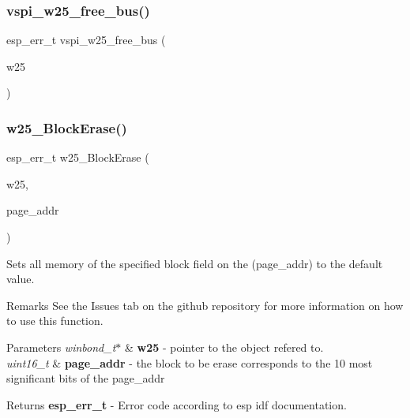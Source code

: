 \mbox{\label{_w25_n01_g_v_8h_ad6fb3cbe30326d7cc60cf88f444c931f}} 
\subsubsection{vspi\+\_\+w25\+\_\+free\+\_\+bus()}
{\footnotesize\ttfamily esp\+\_\+err\+\_\+t vspi\+\_\+w25\+\_\+free\+\_\+bus (\begin{DoxyParamCaption}\item[{\textbf{ winbond\+\_\+t} $\ast$}]{w25 }\end{DoxyParamCaption})}

\mbox{\label{_w25_n01_g_v_8h_aa081e561616cad89a37215626e830fa9}} 
\subsubsection{w25\+\_\+\+Block\+Erase()}
{\footnotesize\ttfamily esp\+\_\+err\+\_\+t w25\+\_\+\+Block\+Erase (\begin{DoxyParamCaption}\item[{const \textbf{ winbond\+\_\+t} $\ast$}]{w25,  }\item[{uint16\+\_\+t}]{page\+\_\+addr }\end{DoxyParamCaption})}

Sets all memory of the specified block field on the (page\+\_\+addr) to the default value. \begin{DoxyRemark}{Remarks}
See the Issues tab on the github repository for more information on how to use this function. 
\end{DoxyRemark}

\begin{DoxyParams}{Parameters}
{\em winbond\+\_\+t$\ast$} & {\bfseries w25} -\/ pointer to the object refered to. \\
\hline
{\em uint16\+\_\+t} & {\bfseries page\+\_\+addr} -\/ the block to be erase corresponds to the 10 most significant bits of the page\+\_\+addr \\
\hline
\end{DoxyParams}
\begin{DoxyReturn}{Returns}
{\bfseries esp\+\_\+err\+\_\+t} -\/ Error code according to esp idf documentation. 
\end{DoxyReturn}
\mbox{\label{_w25_n01_g_v_8h_a728dddae1bc26bb72102470e715fead6}} 
